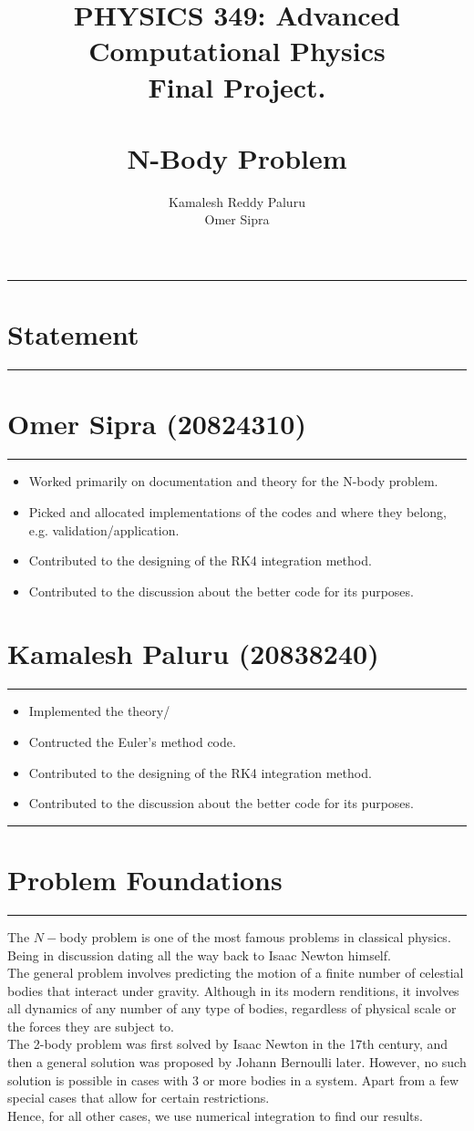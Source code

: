\documentclass[hidelinks, 11pt, dvipsnames]{article}
\title{PHYSICS 349: Advanced Computational Physics\\
Final Project.\\
\textbf{  } \\
\textbf{N-Body Problem}}
\author{Kamalesh Reddy Paluru\\
Omer Sipra}
\newcommand{\psection}[1]{{
    \begin{center}
        \noindent \rule{17cm}{0.4pt}
            \section*{\LARGE #1}
        \noindent \rule{17cm}{0.4pt}
    \end{center}
}}
\newcommand{\psubsubsection}[1]{{
    \section*{#1}
    \noindent \rule{17cm}{0.11pt}
}}
\begin{document}
\maketitle
\psection{Statement}
\psubsubsection{Omer Sipra (20824310)}
\begin{itemize}
    \item Worked primarily on documentation and theory for the N-body problem.
    \item Picked and allocated implementations of the codes and where they belong, e.g. validation/application. 
    \item Contributed to the designing of the RK4 integration method.
    \item Contributed to the discussion about the better code for its purposes.
\end{itemize}

\psubsubsection{Kamalesh Paluru (20838240)}
\begin{itemize}
    \item Implemented the theory/
    \item Contructed the Euler's method code. 
    \item Contributed to the designing of the RK4 integration method.
    \item Contributed to the discussion about the better code for its purposes.
\end{itemize}

\newpage
\psection{Problem Foundations}
The $N-$body problem is one of the most famous problems in classical physics. Being in discussion dating all the way back to Isaac Newton himself. \\

The general problem involves predicting the motion of a finite number of celestial bodies that interact under gravity. Although in its modern renditions, it involves all dynamics of any number of any type of bodies, regardless of physical scale or the forces they are subject to.\\

The 2-body problem was first solved by Isaac Newton in the 17th century, and then a general solution was proposed by Johann Bernoulli later. However, no such solution is possible in cases with 3 or more bodies in a system. Apart from a few special cases that allow for certain restrictions. \\

Hence, for all other cases, we use numerical integration to find our results.\\
\end{document}
